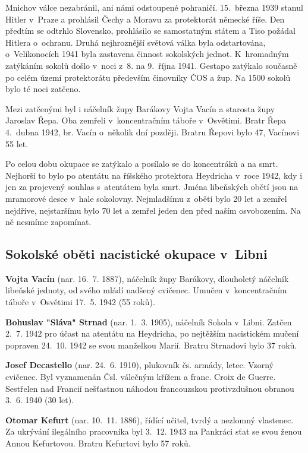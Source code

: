 \documentclass[a5paper, 11pt, twoside]{article}
\begin{document}
Mnichov válce nezabránil, ani námi odstoupené pohraničí. 15.~března 1939
stanul Hitler v~Praze a prohlásil Čechy a Moravu za protektorát německé
říše. Den předtím se odtrhlo Slovensko, prohlásilo se samostatným státem
a Tiso požádal Hitlera o~ochranu. Druhá nejhroznější světová válka byla
odstartována, o~Velikonocích 1941 byla zastavena činnost sokolských
jednot. K~hromadným zatýkáním sokolů došlo v~noci z~8. na 9.~října 1941.
Gestapo zatýkalo současně po celém území protektorátu především
činovníky ČOS a žup. Na 1500 sokolů bylo té noci zatčeno.

Mezi zatčenými byl i náčelník župy Barákovy Vojta Vacín a starosta župy
Jaroslav Řepa. Oba zemřeli v~koncentračním táboře v~Osvětimi. Bratr Řepa
4.~dubna 1942, br. Vacín o~několik dní později. Bratru Řepovi bylo 47,
Vacínovi 55 let.

Po celou dobu okupace se zatýkalo a posílalo se do koncentráků a na
smrt. Nejhorší to bylo po atentátu na říšského protektora Heydricha
v~roce 1942, kdy i jen za projevený souhlas s~atentátem byla smrt. Jména
libeňských obětí jsou na mramorové desce v~hale sokolovny. Nejmladšímu
z~obětí bylo 20 let a zemřel nejdříve, nejstaršímu bylo 70 let a zemřel
jeden den před naším osvobozením. Na ně nesmíme zapomínat.

\subsection{Sokolské oběti nacistické okupace v~Libni}

\textbf{Vojta Vacín} (nar. 16.~7. 1887), náčelník župy Barákovy,
dlouholetý náčelník libeňské jednoty, od svého mládí nadšený cvičenec.
Umučen v~koncentračním táboře v~Osvětimi 17.~5. 1942 (55 roků).

\textbf{Bohuslav "Sláva" Strnad} (nar. 1.~3. 1905), náčelník Sokola
v~Libni. Zatčen 2.~7. 1942 pro účast na atentátu na Heydricha, po
nejtěžším nacistickém mučení popraven 24.~10. 1942 se svou manželkou
Marií. Bratru Strnadovi bylo 37 roků.

\textbf{Josef Decastello} (nar. 24.~6. 1910), plukovník čs. armády,
letec. Vzorný cvičenec. Byl vyznamenán Čsl. válečným křížem a franc.
Croix de Guerre. Sestřelen nad Francií nešťastnou náhodou
francouzskou protivzdušnou obranou 3.~6. 1940 (30 let).

\textbf{Otomar Kefurt} (nar. 10.~11. 1886), řídící učitel, tvrdý a
nezlomný vlastenec. Za ukrývání ilegálního pracovníka byl 3.~12. 1943 na
Pankráci sťat se svou ženou Annou Kefurtovou. Bratru Kefurtovi bylo 57
roků.
\end{document}

